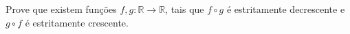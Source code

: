 Prove que existem funções $f,g : \mathbb{R} \to \mathbb{R}$, tais que $f \circ g$ é estritamente decrescente e $g\circ f$ é estritamente crescente.
